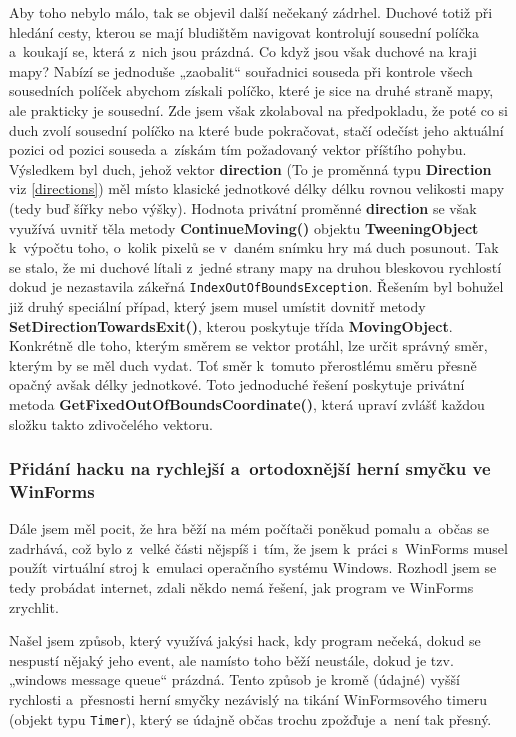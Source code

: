 \documentclass{article}
\begin{document}
Aby toho nebylo málo, tak se objevil další nečekaný zádrhel. Duchové totiž při hledání cesty, kterou se mají bludištěm navigovat kontrolují sousední políčka a~koukají se, která z~nich jsou prázdná. Co když jsou však duchové na kraji mapy? Nabízí se jednoduše „zaobalit“ souřadnici souseda při kontrole všech sousedních políček abychom získali políčko, které je sice na druhé straně mapy, ale prakticky je sousední. Zde jsem však zkolaboval na předpokladu, že poté co si duch zvolí sousední políčko na které bude pokračovat, stačí odečíst jeho aktuální pozici od pozici souseda a~získám tím požadovaný vektor příštího pohybu. Výsledkem byl duch, jehož vektor \textbf{direction} (To je proměnná typu \textbf{Direction} viz \ref{directions}) měl místo klasické jednotkové délky délku rovnou velikosti mapy (tedy buď šířky nebo výšky). Hodnota privátní proměnné \textbf{direction} se však využívá uvnitř těla metody \textbf{ContinueMoving()} objektu \textbf{TweeningObject} k~výpočtu toho, o~kolik pixelů se v~daném snímku hry má duch posunout. Tak se stalo, že mi duchové lítali z~jedné strany mapy na druhou bleskovou rychlostí dokud je nezastavila zákeřná \verb|IndexOutOfBoundsException|. Řešením byl bohužel již druhý speciální případ, který jsem musel umístit dovnitř metody \textbf{SetDirectionTowardsExit()}, kterou poskytuje třída \textbf{MovingObject}. Konkrétně dle toho, kterým směrem se vektor protáhl, lze určit správný směr, kterým by se měl duch vydat. Toť směr k~tomuto přerostlému směru přesně opačný avšak délky jednotkové. Toto jednoduché řešení poskytuje privátní metoda \textbf{GetFixedOutOfBoundsCoordinate()}, která upraví zvlášť každou složku takto zdivočelého vektoru.

\subsubsection{Přidání hacku na rychlejší a~ortodoxnější herní smyčku ve WinForms} \label{gameloophack}
Dále jsem měl pocit, že hra běží na mém počítači poněkud pomalu a~občas se zadrhává, což bylo z~velké části nějspíš i~tím, že jsem k~práci s~WinForms musel použít virtuální stroj k~emulaci operačního systému Windows. Rozhodl jsem se tedy probádat internet, zdali někdo nemá řešení, jak program ve WinForms zrychlit. 

Našel jsem způsob, který využívá jakýsi hack, kdy program nečeká, dokud se nespustí nějaký jeho event, ale namísto toho běží neustále, dokud je tzv. „windows message queue“ prázdná. Tento způsob je kromě (údajné) vyšší rychlosti a~přesnosti herní smyčky nezávislý na tikání WinFormsového timeru (objekt typu \verb|Timer|), který se údajně občas trochu zpožďuje a~není tak přesný. 
\end{document}
